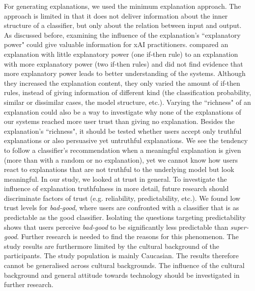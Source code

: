 For generating explanations, we used the minimum explanation approach. The approach is limited in that it does not deliver information about the inner structure of a classifier, but only about the relation between input and output. As discussed before, examining the influence of the explanation's ``explanatory power" could give valuable information for xAI practitioners. \cite{ribeiro2018anchors} compared an explanation with little explanatory power (one if-then rule) to an explanation with more explanatory power (two if-then rules) and did not find evidence that more explanatory power leads to better understanding of the systems. Although they increased the explanation content, they only varied the amount of if-then rules, instead of giving information of different kind (the classification probability, similar or dissimilar cases, the model structure, etc.). Varying the ``richness" of an explanation could also be a way to investigate why none of the explanations of our systems reached more user trust than giving no explanation.\newline
Besides the explanation's ``richness", it should be tested whether users accept only truthful explanations or also persuasive yet untruthful explanations. We see the tendency to follow a classifier's recommendation when a meaningful explanation is given (more than with a random or no explanation), yet we cannot know how users react to explanations that are not truthful to the underlying model but look meaningful.\newline
In our study, we looked at trust in general. To investigate the influence of explanation truthfulness in more detail, future research should discriminate factors of trust (e.g. reliability, predictability, etc.). We found low trust levels for \textit{bad-good}, where users are confronted with a classifier that is as predictable as the good classifier. Isolating the questions targeting predictability shows that users perceive \textit{bad-good} to be significantly less predictable than \textit{super-good}. Further research is needed to find the reasons for this phenomenon.\newline
The study results are furthermore limited by the cultural background of the participants. The study population is mainly Caucasian. The results therefore cannot be generalised across cultural backgrounds. The influence of the cultural background and general attitude towards technology should be investigated in further research.
